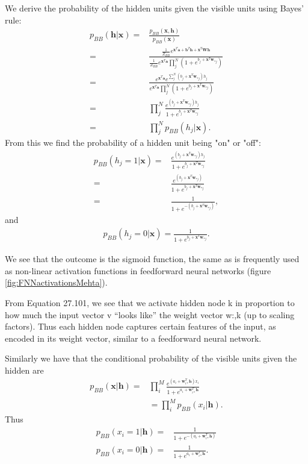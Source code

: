 We derive the probability of the hidden units given the visible units using Bayes' rule:
\begin{align}
	p_{BB} (\bm{h}|\bm{x}) =& \frac{p_{BB} (\bm{x}, \bm{h})}{p_{BB} (\bm{x})} \nonumber \\
	=& \frac{ \frac{1}{Z_{BB}}  e^{\bm{x}^T \bm{a} + \bm{b}^T \bm{h} + \bm{x}^T \bm{W} \bm{h}} }
	        {\frac{1}{Z_{BB}} e^{\bm{x}^T \bm{a}} \prod_j^N (1 + e^{b_j + \bm{x}^T \bm{w}_{\ast j}})} \nonumber \\
	=& \frac{  e^{\bm{x}^T \bm{a}} e^{ \sum_j^N (b_j + \bm{x}^T \bm{w}_{\ast j} ) h_j} }
	        { e^{\bm{x}^T \bm{a}} \prod_j^N (1 + e^{b_j + \bm{x}^T \bm{w}_{\ast j}})} \nonumber \\
	=& \prod_j^N \frac{ e^{(b_j + \bm{x}^T \bm{w}_{\ast j} ) h_j}  }
	{1 + e^{b_j + \bm{x}^T \bm{w}_{\ast j}}} \nonumber \\
	=& \prod_j^N p_{BB} (h_j| \bm{x}) .
\end{align}
From this we find the probability of a hidden unit being "on" or "off":
\begin{align}
	p_{BB} (h_j=1 | \bm{x}) =&   \frac{ e^{(b_j + \bm{x}^T \bm{w}_{\ast j} ) h_j}  }
	{1 + e^{b_j + \bm{x}^T \bm{w}_{\ast j}}} \\
	=&  \frac{ e^{(b_j + \bm{x}^T \bm{w}_{\ast j} )}  }
	{1 + e^{b_j + \bm{x}^T \bm{w}_{\ast j}}} \\
	=&  \frac{ 1 }{1 + e^{-(b_j + \bm{x}^T \bm{w}_{\ast j})} } ,
\end{align}
and
\begin{align}
	p_{BB} (h_j=0 | \bm{x}) =\frac{ 1 }{1 + e^{b_j + \bm{x}^T \bm{w}_{\ast j}} } .
\end{align}

We see that the outcome is the sigmoid function, the same as is frequently used as non-linear activation functions in feedforward neural networks (figure \ref{fig:FNNactivationsMehta}).

From Equation 27.101, we see that we activate hidden node k in
proportion to how much the input vector v “looks like” the weight
vector w:,k (up to scaling factors). Thus each hidden node captures
certain features of the input, as encoded in its weight vector,
similar to a feedforward neural network. \cite{Murphy}

Similarly we have that the conditional probability of the visible units given the hidden are
\begin{align}
	p_{BB} (\bm{x}|\bm{h}) =& \prod_i^M \frac{ e^{ (a_i + \bm{w}_{i\ast}^T \bm{h}) x_i} }{ 1 + e^{a_i + \bm{w}_{i\ast}^T \bm{h}} } \\
	&= \prod_i^M p_{BB} (x_i | \bm{h}) .
\end{align}
Thus
\begin{align}
	p_{BB} (x_i=1 | \bm{h}) =& \frac{1}{1 + e^{-(a_i + \bm{w}_{i\ast}^T \bm{h} )}} \\
	p_{BB} (x_i=0 | \bm{h}) =& \frac{1}{1 + e^{a_i + \bm{w}_{i\ast}^T \bm{h} }} .
\end{align}






